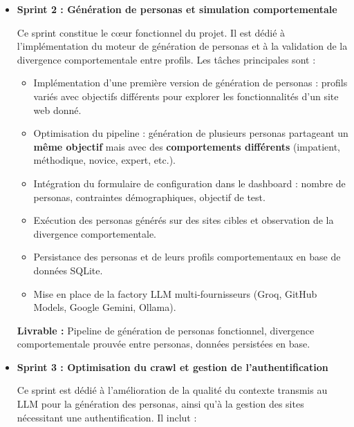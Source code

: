 \begin{itemize}
\item \textbf{Sprint 2 : Génération de personas et simulation 
comportementale}

Ce sprint constitue le cœur fonctionnel du projet. Il est dédié à 
l'implémentation du moteur de génération de personas et à la validation 
de la divergence comportementale entre profils. Les tâches principales 
sont :

\begin{itemize}
    \item Implémentation d'une première version de génération de 
    personas : profils variés avec objectifs différents pour explorer 
    les fonctionnalités d'un site web donné.
    \item Optimisation du pipeline : génération de plusieurs personas 
    partageant un \textbf{même objectif} mais avec des \textbf{comportements 
    différents} (impatient, méthodique, novice, expert, etc.).
    \item Intégration du formulaire de configuration dans le dashboard : 
    nombre de personas, contraintes démographiques, objectif de test.
    \item Exécution des personas générés sur des sites cibles et 
    observation de la divergence comportementale.
    \item Persistance des personas et de leurs profils comportementaux 
    en base de données SQLite.
    \item Mise en place de la factory LLM multi-fournisseurs (Groq, 
    GitHub Models, Google Gemini, Ollama).
\end{itemize}

\textbf{Livrable :} Pipeline de génération de personas fonctionnel, 
divergence comportementale prouvée entre personas, données persistées 
en base.

\item \textbf{Sprint 3 : Optimisation du crawl et gestion de 
l'authentification}

Ce sprint est dédié à l'amélioration de la qualité du contexte transmis 
au LLM pour la génération des personas, ainsi qu'à la gestion des sites 
nécessitant une authentification. Il inclut :


\end{itemize}

